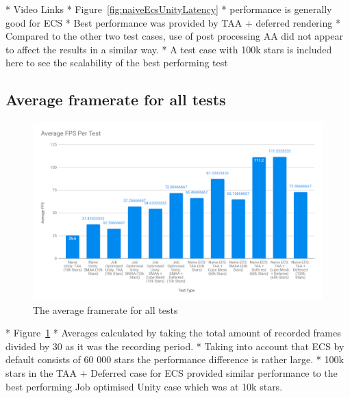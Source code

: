 * Video Links
* Figure~\ref{fig:naiveEcsUnityLatency}
* performance is generally good for ECS
* Best performance was provided by TAA + deferred rendering
* Compared to the other two test cases, use of post processing AA did not appear to affect the results in a similar way. 
* A test case with 100k stars is included here to see the scalability of the best performing test

\subsection{Average framerate for all tests}
\begin{figure}[!p]
    \centering
    \includegraphics[width=1\textwidth]{Figures/averageFpsPerTest.png}
    \caption[Average Framerate Per Test]{The average framerate for all tests}
    \label{fig:averageFPS}
\end{figure}

* Figure~\ref{fig:averageFPS}
* Averages calculated by taking the total amount of recorded frames divided by 30 as it was the recording period.
* Taking into account that ECS by default consists of 60 000 stars the performance difference is rather large. 
* 100k stars in the TAA + Deferred case for ECS provided similar performance to the best performing Job optimised Unity case which was at 10k stars. 